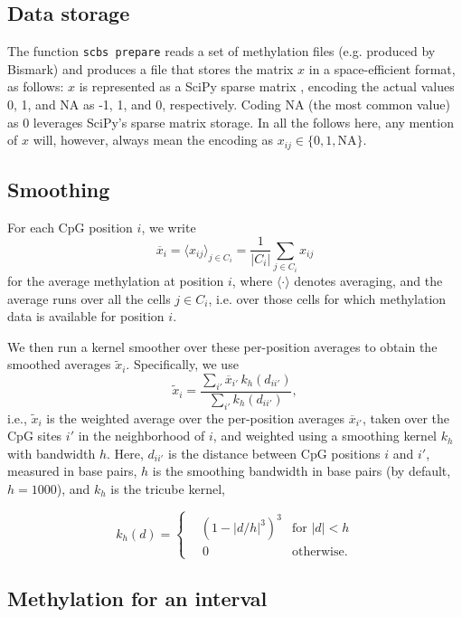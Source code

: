 \documentclass[twocolumn,10pt]{article}
\begin{document}
\subsection{Data storage}

The function \texttt{scbs prepare} reads a set of methylation files (e.g. produced by Bismark) and produces a file that stores the matrix $x$ in a space-efficient format, as follows: $x$ is represented as a SciPy sparse matrix \citep{SciPy}, encoding the actual values 0, 1, and NA as -1, 1, and 0, respectively.
Coding NA (the most common value) as 0 leverages SciPy's sparse matrix storage.
In all the follows here, any mention of $x$ will, however, always mean the encoding as $x_{ij}\in\{0,1,\text{NA}\}$.

\subsection{Smoothing}

For each CpG position $i$, we write 
$$\overline{x}_i=\langle x_{ij} \rangle_{j\in C_i} = \frac{1}{|C_i|}\sum_{j\in C_i} x_{ij}$$ 
for the average methylation at position $i$, where $\langle\cdot\rangle$ denotes averaging, and the average runs over all the cells $j\in C_i$, i.e.
over those cells for which methylation data is available for position $i$.

We then run a kernel smoother over these per-position averages to obtain the smoothed averages $\tilde x_i$.
Specifically, we use
\[ \tilde x_i = \frac{\sum_{i'} \overline x_{i'}\, k_h(d_{ii'})}{\sum_{i'} k_h(d_{ii'})},\]
i.e., $\tilde x_i$ is the weighted average over the per-position averages $\overline{x}_{i'}$, taken over the CpG sites $i'$ in the neighborhood of $i$, and weighted using a smoothing kernel $k_h$ with bandwidth $h$.
Here, $d_{ii'}$ is the distance between CpG positions $i$ and $i'$, measured in base pairs, $h$ is the smoothing bandwidth in base pairs (by default, $h=1000$), and $k_h$ is the tricube kernel,

\[ k_h(d) = \left\{
\begin{aligned}
    &\left(1-|d/h|^3\right)^3 &\text{for } |d|<h \\
    &\,0 &\text{otherwise}.
\end{aligned}
\right.
\]

\subsection{Methylation for an interval}
\end{document}
